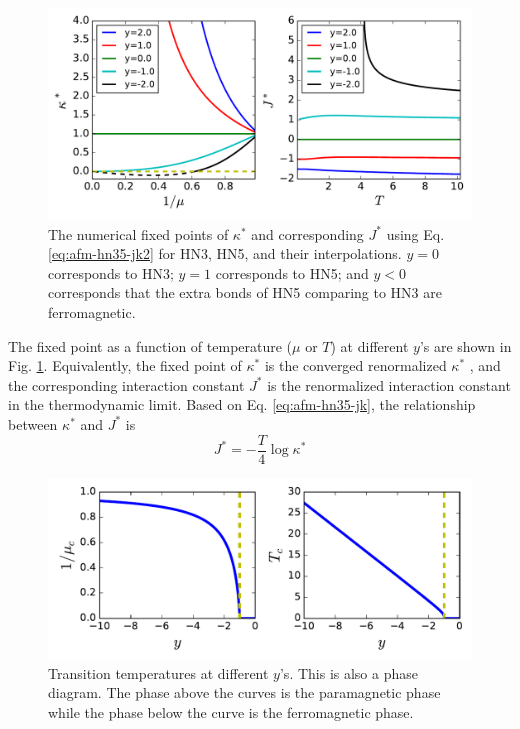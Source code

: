 \begin{figure}
\centering \includegraphics[width=0.9\columnwidth]{Chapter-3/HN35_KJvsTys.pdf}
\protect\caption{The numerical fixed points of $\kappa^*$ and corresponding $J^*$ using Eq. \ref{eq:afm-hn35-jk2} for HN3, HN5, and their interpolations. $y=0$ corresponds to HN3; $y=1$ corresponds to HN5; and $y<0$ corresponds that the extra bonds of HN5 comparing to HN3 are ferromagnetic. }
\label{fig:afm-HN35KJ_ys} 
\end{figure}


The fixed point as a function of temperature ($\mu$ or $T$) at different $y$'s are shown in Fig. \ref{fig:afm-HN35KJ_ys}. Equivalently, the fixed point of $\kappa^*$ is the converged renormalized $\kappa^*$ , and the corresponding interaction constant $J^*$ is the renormalized interaction constant in the thermodynamic limit. Based on Eq. \ref{eq:afm-hn35-jk}, the relationship between $\kappa^*$ and $J^*$ is
\begin{equation}
J^* = -\frac{T}{4} \log \kappa^*
\label{eq:afm-hn35-jk2}
\end{equation}




\begin{figure}
\centering \includegraphics[width=0.9\columnwidth]{Chapter-3/HN35ysTransVsY.pdf}
\protect\caption{Transition temperatures at different $y$'s. This is also a phase diagram. The phase above the curves is the paramagnetic phase while the phase below the curve is the ferromagnetic phase.}
\label{fig:afm-hn35transys} 
\end{figure}

